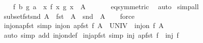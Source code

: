 \begin{isabellebody}
\ \ \isamarkupfalse%
\ {\isachardoublequoteopen}{\isacharparenleft}{\kern0pt}f\ b{\isacharcomma}{\kern0pt}\ g\ a{\isacharparenright}{\kern0pt}\ {\isasymin}\ {\isacharparenleft}{\kern0pt}{\isasymlambda}x{\isachardot}{\kern0pt}\ {\isacharparenleft}{\kern0pt}f\ x{\isacharcomma}{\kern0pt}\ g\ x{\isacharparenright}{\kern0pt}{\isacharparenright}{\kern0pt}\ {\isacharbackquote}{\kern0pt}\ A{\isachardoublequoteclose}\isanewline
\ \ \ \ \isamarkupfalse%
\ {\isacharasterisk}{\kern0pt}\ eq{\isacharbrackleft}{\kern0pt}symmetric{\isacharbrackright}{\kern0pt}\ \isamarkupfalse%
\ auto\isanewline
{}\isamarkupfalse%
\ simp{\isacharunderscore}{\kern0pt}all%
\endisatagproof
{\isafoldproof}%
%
\isadelimproof
\isanewline
%
\endisadelimproof
\isanewline
{}\isamarkupfalse%
\ subset{\isacharunderscore}{\kern0pt}fst{\isacharunderscore}{\kern0pt}snd{\isacharcolon}{\kern0pt}\ {\isachardoublequoteopen}A\ {\isasymsubseteq}\ {\isacharparenleft}{\kern0pt}fst\ {\isacharbackquote}{\kern0pt}\ A\ {\isasymtimes}\ snd\ {\isacharbackquote}{\kern0pt}\ A{\isacharparenright}{\kern0pt}{\isachardoublequoteclose}\isanewline
%
\isadelimproof
\ \ %
\endisadelimproof
%
\isatagproof
{}\isamarkupfalse%
\ force%
\endisatagproof
{\isafoldproof}%
%
\isadelimproof
\isanewline
%
\endisadelimproof
\isanewline
{}\isamarkupfalse%
\ inj{\isacharunderscore}{\kern0pt}on{\isacharunderscore}{\kern0pt}apfst\ {\isacharbrackleft}{\kern0pt}simp{\isacharbrackright}{\kern0pt}{\isacharcolon}{\kern0pt}\ {\isachardoublequoteopen}inj{\isacharunderscore}{\kern0pt}on\ {\isacharparenleft}{\kern0pt}apfst\ f{\isacharparenright}{\kern0pt}\ {\isacharparenleft}{\kern0pt}A\ {\isasymtimes}\ UNIV{\isacharparenright}{\kern0pt}\ {\isasymlongleftrightarrow}\ inj{\isacharunderscore}{\kern0pt}on\ f\ A{\isachardoublequoteclose}\isanewline
%
\isadelimproof
\ \ %
\endisadelimproof
%
\isatagproof
{}\isamarkupfalse%
\ {\isacharparenleft}{\kern0pt}auto\ simp\ add{\isacharcolon}{\kern0pt}\ inj{\isacharunderscore}{\kern0pt}on{\isacharunderscore}{\kern0pt}def{\isacharparenright}{\kern0pt}%
\endisatagproof
{\isafoldproof}%
%
\isadelimproof
\isanewline
%
\endisadelimproof
\isanewline
{}\isamarkupfalse%
\ inj{\isacharunderscore}{\kern0pt}apfst\ {\isacharbrackleft}{\kern0pt}simp{\isacharbrackright}{\kern0pt}{\isacharcolon}{\kern0pt}\ {\isachardoublequoteopen}inj\ {\isacharparenleft}{\kern0pt}apfst\ f{\isacharparenright}{\kern0pt}\ {\isasymlongleftrightarrow}\ inj\ f{\isachardoublequoteclose}\isanewline
%
\isadelimproof

\end{isabellebody}
